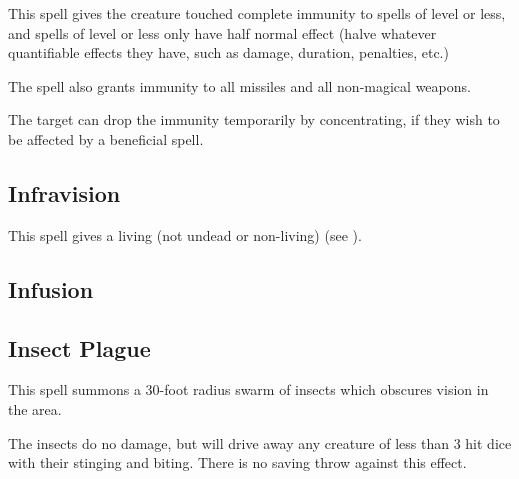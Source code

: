 \begin{multicols*}{2}
This spell gives the creature touched complete immunity to spells of  level or less, and spells of  level or less only have half normal effect (halve whatever quantifiable effects they have, such as damage, duration, penalties, etc.)

The spell also grants immunity to all missiles and all non-magical weapons.

The target can drop the immunity temporarily by concentrating, if they wish to be affected by a beneficial spell.

\subsection{Infravision}\label{spell:Infravision}

This spell gives a living (not undead or non-living)  (see ).

\subsection{Infusion}\label{spell:Infusion}



\subsection{Insect Plague}\label{spell:Insect Plague}

This spell summons a 30-foot radius swarm of insects which obscures vision in the area.

The insects do no damage, but will drive away any creature of less than 3 hit dice with their stinging and biting. There is no saving throw against this effect.


\end{multicols*}
